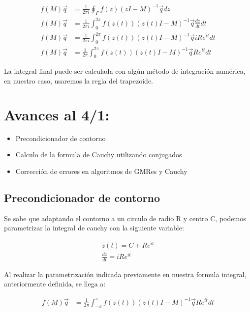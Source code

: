 \documentclass[fleqn]{article}
\begin{document}
\begin{align*}
    f(M)\vec{q} &= \frac{1}{2\pi i} \oint_{\Gamma} f(z)(zI - M)^{-1}\vec{q}dz \\
    f(M)\vec{q} &= \frac{1}{2\pi i} \int_{0}^{2\pi} f(z(t))(z(t)I - M)^{-1}\vec{q}\frac{dz}{dt}dt \\
    f(M)\vec{q} &= \frac{1}{2\pi i} \int_{0}^{2\pi} f(z(t))(z(t)I - M)^{-1}\vec{q}iRe^{it}dt \\
    f(M)\vec{q} &= \frac{1}{2\pi} \int_{0}^{2\pi} f(z(t))(z(t)I - M)^{-1}\vec{q}Re^{it}dt
\end{align*}

La integral final puede ser calculada con algún método de integración numérica, en nuestro caso, usaremos la regla del trapezoide.

\newpage
\section{Avances al 4/1:}

\begin{itemize}
\item Precondicionador de contorno
\item Calculo de la formula de Cauchy utilizando conjugados
\item Corrección de errores en algoritmos de GMRes y Cauchy
\end{itemize}

\subsection{Precondicionador de contorno}
Se sabe\cite{2} que adaptando el contorno a un circulo de radio R y centro C, podemos parametrizar la integral de cauchy con la siguiente variable:

\begin{align*}
    z(t)= C + Re^{it}\\
    \displaystyle{\frac{dz}{dt}} = iRe^{it}
\end{align*}

Al realizar la parametrización indicada previamente en nuestra formula integral, anteriormente definida, se llega a:

\begin{align*}
f(M)\vec{q} &= \frac{1}{2\pi} \int_{-\pi}^{\pi} f(z(t))(z(t)I - M)^{-1}\vec{q}Re^{it}dt
\end{align*}
\end{document}
